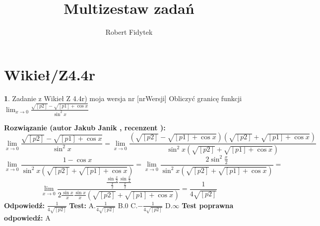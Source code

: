 \documentclass[12pt, a4paper]{article}
\title{Multizestaw zadań}
\author{Robert Fidytek}
\date{}
\theoremstyle{definition} %
\newtheorem{zad}{}
\newcommand{\kategoria}[1]{\section{#1}} %
\newcommand{\zadStart}[1]{\begin{zad}#1\newline} %
\newcommand{\zadStop}{\end{zad}}   %
\newcommand{\rozwStart}[2]{\noindent \textbf{Rozwiązanie (autor #1 , recenzent #2): }\newline} %
\newcommand{\rozwStop}{\newline}                                            %
\newcommand{\odpStart}{\noindent \textbf{Odpowiedź:}\newline}    %
\newcommand{\odpStop}{\newline}                                             %
\newcommand{\testStart}{\noindent \textbf{Test:}\newline} %
\newcommand{\testStop}{\newline} %
\newcommand{\kluczStart}{\noindent \textbf{Test poprawna odpowiedź:}\newline} %
\newcommand{\kluczStop}{\newline} %
\begin{document}
\maketitle


\kategoria{Wikieł/Z4.4r}
\zadStart{Zadanie z Wikieł Z 4.4r) moja wersja nr [nrWersji]}
Obliczyć granicę funkcji $\lim_{x \to 0} \frac{\sqrt{[p2]}-\sqrt{[p1]+\cos{x}}}{\sin^2{x}}$
\zadStop
\rozwStart{Jakub Janik}{}
$$\lim_{x \to 0} \frac{\sqrt{[p2]}-\sqrt{[p1]+\cos{x}}}{\sin^2{x}}=\lim_{x \to 0} \frac{(\sqrt{[p2]}-\sqrt{[p1]+\cos{x}})(\sqrt{[p2]}+\sqrt{[p1]+\cos{x}})}{\sin^2{x}(\sqrt{[p2]}+\sqrt{[p1]+\cos{x}})}$$
$$\lim_{x \to 0} \frac{1-\cos{x}}{\sin^2{x}(\sqrt{[p2]}+\sqrt{[p1]+\cos{x}})}=\lim_{x \to 0} \frac{2\sin^2{\frac{x}{2}}}{\sin^2{x}(\sqrt{[p2]}+\sqrt{[p1]+\cos{x}})}=$$
$$\lim_{x \to 0} \frac{\frac{\sin{\frac{x}{2}}}{\frac{x}{2}}\frac{\sin{\frac{x}{2}}}{\frac{x}{2}}}{2\frac{\sin{x}}{x}\frac{\sin{x}}{x}(\sqrt{[p2]}+\sqrt{[p1]+\cos{x}})}=\frac{1}{4\sqrt{[p2]}}$$
\rozwStop
\odpStart
$\frac{1}{4\sqrt{[p2]}}$
\odpStop
\testStart
A.$\frac{1}{4\sqrt{[p2]}}$
B.$0$
C.$-\frac{1}{4\sqrt{[p2]}}$
D.$\infty$
\testStop
\kluczStart
A
\kluczStop
\end{document}
